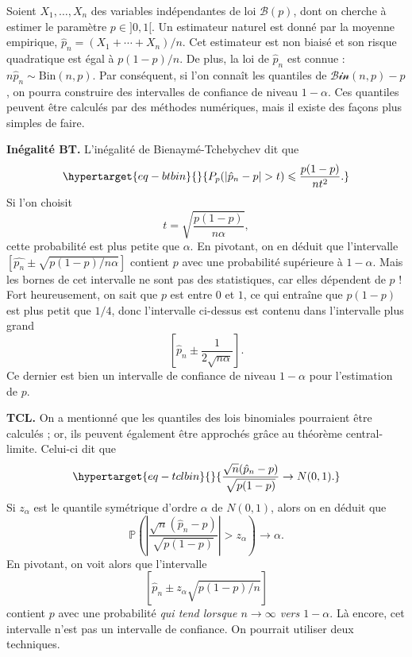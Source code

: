 \documentclass[
  10,
  letterpaper,
  DIV=11,
  numbers=noendperiod]{scrreport}
\theoremstyle{plain}
\theoremstyle{definition}
\theoremstyle{plain}
\theoremstyle{definition}
\theoremstyle{definition}
\theoremstyle{plain}
\theoremstyle{remark}
\begin{document}
Soient \(X_1, \dotsc, X_n\) des variables indépendantes de loi
\(\mathscr{B}(p)\), dont on cherche à estimer le paramètre
\(p\in ]0,1[\). Un estimateur naturel est donné par la moyenne
empirique, \(\hat{p}_n = (X_1 + \dotsb + X_n)/n\). Cet estimateur est
non biaisé et son risque quadratique est égal à \(p(1-p)/n\). De plus,
la loi de \(\hat{p}_n\) est connue :
\(n\hat{p}_n \sim \mathrm{Bin}(n,p)\). Par conséquent, si l'on connaît
les quantiles de \(\mathscr{Bin}(n,p)-p\), on pourra construire des
intervalles de confiance de niveau \(1-\alpha\). Ces quantiles peuvent
être calculés par des méthodes numériques, mais il existe des façons
plus simples de faire.

\textbf{Inégalité BT. } L'inégalité de Bienaymé-Tchebychev dit que
\begin{equation}\protect\hypertarget{eq-btbin}{}{P_p(|\hat{p}_n - p|>t)\leqslant \frac{p(1-p)}{nt^2}. }\label{eq-btbin}\end{equation}
Si l'on choisit \[t = \sqrt{\frac{p(1-p)}{n\alpha}},\] cette probabilité
est plus petite que \(\alpha\). En pivotant, on en déduit que
l'intervalle \([\hat{p_n} \pm \sqrt{p(1-p)/n\alpha}]\) contient \(p\)
avec une probabilité supérieure à \(1-\alpha\). Mais les bornes de cet
intervalle ne sont pas des statistiques, car elles dépendent de \(p\) !
Fort heureusement, on sait que \(p\) est entre \(0\) et \(1\), ce qui
entraîne que \(p(1-p)\) est plus petit que \(1/4\), donc l'intervalle
ci-dessus est contenu dans l'intervalle plus grand
\[ \left[\hat{p}_n \pm \frac{1}{2\sqrt{n\alpha}}\right]. \] Ce dernier
est bien un intervalle de confiance de niveau \(1-\alpha\) pour
l'estimation de \(p\).

\textbf{TCL. } On a mentionné que les quantiles des lois binomiales
pourraient être calculés ; or, ils peuvent également être approchés
grâce au théorème central-limite. Celui-ci dit que
\begin{equation}\protect\hypertarget{eq-tclbin}{}{ \frac{\sqrt{n}(\hat{p}_n - p)}{\sqrt{p(1-p)}} \to N(0,1).}\label{eq-tclbin}\end{equation}
Si \(z_\alpha\) est le quantile symétrique d'ordre \(\alpha\) de
\(N(0,1)\), alors on en déduit que
\[\mathbb{P}\left(\left|\frac{\sqrt{n}(\hat{p}_n - p)}{\sqrt{p(1-p)}} \right|>z_\alpha \right) \to \alpha. \]
En pivotant, on voit alors que l'intervalle
\[\left[\hat{p}_n \pm z_\alpha \sqrt{p(1-p)/n}\right] \] contient \(p\)
avec une probabilité \emph{qui tend lorsque \(n\to\infty\) vers
\(1-\alpha\)}. Là encore, cet intervalle n'est pas un intervalle de
confiance. On pourrait utiliser deux techniques.
\end{document}
